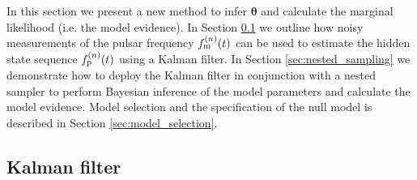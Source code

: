 \documentclass[fleqn,usenatbib,useAMS]{mnras}
\begin{document}
In this section we present a new method to infer $\boldsymbol{\theta}$ and calculate the marginal likelihood (i.e. the model evidence). In Section \ref{sec:kalman_filter} we outline how noisy measurements of the pulsar frequency $f_{\rm m}^{(n)}(t)$ can be used to estimate the hidden state sequence $f_{\rm p}^{(n)}(t)$ using a Kalman filter. In Section \ref{sec:nested_sampling} we demonstrate how to deploy the Kalman filter in conjunction with a nested sampler to perform Bayesian inference of the model parameters and calculate the model evidence. Model selection and the specification of the null model is described in Section \ref{sec:model_selection}. 


\subsection{Kalman filter}\label{sec:kalman_filter}
\end{document}
